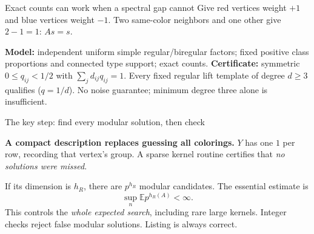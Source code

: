 \documentclass[aspectratio=169,10pt]{beamer}
\newcommand{\E}{\mathbb{E}}
\begin{document}
\begin{frame}{Exact counts can work when a spectral gap cannot}
  Give red vertices weight $+1$ and blue vertices weight $-1$.
  Two same-color neighbors and one other give $2-1=1$: \quad $As=s$.
  \begin{center}
  \end{center}
  \small \textbf{Model:} independent uniform simple regular/biregular factors;
  fixed positive class proportions and connected type support; exact counts.
  \textbf{Certificate:} symmetric $0\le q_{ij}<1/2$ with $\sum_jd_{ij}q_{ij}=1$.
  Every fixed regular lift template of degree $d\ge3$ qualifies ($q=1/d$).
  No noise guarantee; minimum degree three alone is insufficient.
\end{frame}

\begin{frame}{The key step: find every modular solution, then check}
  \begin{center}
  \end{center}
  \textbf{A compact description replaces guessing all colorings.}
  $Y$ has one $1$ per row, recording that vertex's group.
  A sparse kernel routine certifies that \emph{no solutions were missed}.

  If its dimension is $h_R$, there are $p^{h_R}$ modular candidates.
  The essential estimate is
  \[\sup_n\E p^{h_R(A)}<\infty.\]
  \small This controls the \emph{whole expected search}, including rare large kernels.
  Integer checks reject false modular solutions. Listing is always correct.
\end{frame}
\end{document}
